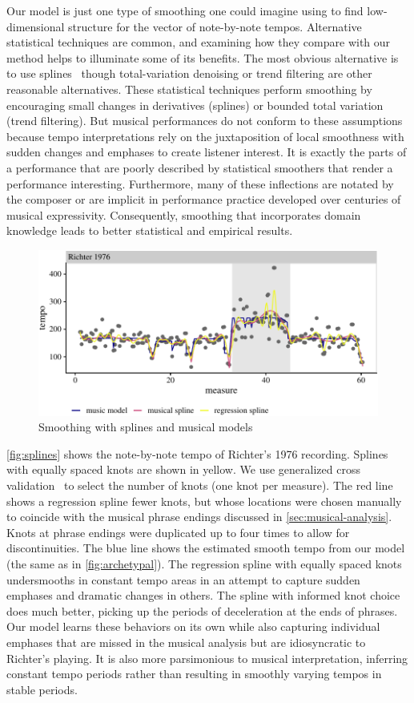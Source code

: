 \documentclass[aoas]{imsart}
\begin{document}
Our model is just one type of smoothing one could imagine using to
find low-dimensional structure for the vector of note-by-note
tempos. Alternative statistical techniques are common, and examining
how they compare with our method helps to illuminate some of its
benefits. The most obvious alternative is to use 
splines~\citep{CravenWahba1978,Wahba1990} though total-variation
denoising or trend filtering \citep{KimKoh2009,Tibshirani2014} are
other reasonable alternatives.
These statistical techniques perform smoothing by encouraging small
changes in derivatives (splines) or bounded total variation
(trend filtering). 
But musical performances do not conform to these assumptions because tempo interpretations rely on the juxtaposition of local smoothness
with sudden changes and emphases to create listener interest. It is
exactly the parts of a performance that are poorly described by
statistical smoothers that render a performance
interesting. Furthermore, many of these
inflections are notated by the 
composer or are implicit in performance practice developed over
centuries of musical expressivity. Consequently, smoothing that
incorporates domain knowledge leads to better statistical and
empirical results.
\begin{figure}[t]
  \centering
  \includegraphics[width=.9\linewidth]{alternative-smoothers-1}
  \caption{Smoothing with splines and musical models}
  \label{fig:splines}
\end{figure}

\autoref{fig:splines}
shows the note-by-note tempo of Richter's 1976 recording. Splines with
equally spaced knots are shown in yellow. We use generalized cross
validation~\citep{GolubHeath1979} to select the number of knots (one
knot per measure). The red line shows a regression spline fewer knots,
but whose locations were chosen
manually
to coincide with the musical phrase endings discussed in
\autoref{sec:musical-analysis}. Knots at phrase endings were
duplicated up to four times to allow for discontinuities. The blue line 
shows the estimated smooth tempo from our model (the same as in
\autoref{fig:archetypal}). The regression spline with
equally spaced knots undersmooths in constant tempo areas in an
attempt to capture sudden emphases and dramatic changes in others. The spline
with informed knot choice does much better, picking up the periods of
deceleration at the ends of phrases. Our model learns these behaviors
on its own while also capturing individual emphases that are missed in
the musical analysis but are idiosyncratic to Richter's playing. It is
also more parsimonious to musical interpretation, inferring constant
tempo periods rather than resulting in smoothly varying tempos in
stable periods.%
\end{document}
